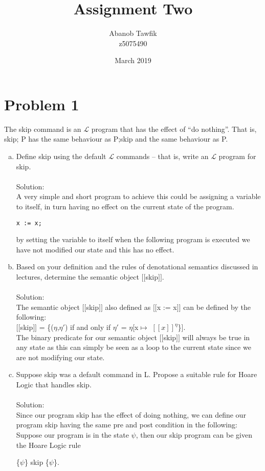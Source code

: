 \documentclass{article}
\title{Assignment Two}
\author{Abanob Tawfik\\z5075490}
\date{March 2019}
\newcommand*\moveToRight[1]{\hspace*{0em plus 1fill}\makebox{(#1)}}
\begin{document}
\maketitle
\section{Problem 1}
The skip command is an $\mathcal{L}$  program that has the effect of “do nothing”. That is, skip; P has the same behaviour as P;skip and the same behaviour as P.
\begin{enumerate}[(a)]
    \item Define skip using the default $\mathcal{L}$ commands – that is, write an $\mathcal{L}$ program for skip. \moveToRight{3 marks}\\\\
    Solution: \\
    A very simple and short program to achieve this could be assigning a variable to itself, in turn having no effect on the current state of the program.
    \begin{lstlisting}[language=Maple,mathescape=true]
x := x;
    \end{lstlisting}
    by setting the variable to itself when the following program is executed we have not modified our state and this has no effect. 
    
    \item Based on your definition and the rules of denotational semantics discussed in lectures, determine the semantic object $[\![$skip$]\!]$. \moveToRight{4 marks}\\\\
    Solution: \\
    The semantic object $[\![$skip$]\!]$ also defined as $[\![$x := x$]\!]$  can be defined by the following:\\
    $[\![$skip$]\!]$ = \{($\eta$,$\eta'$) if and only if $\eta'$ = $\eta$[x$\mapsto$ $[\![x]\!]^\eta$\}].\\
    The binary predicate for our semantic object $[\![$skip$]\!]$ will always be true in any state as this can simply be seen as a loop to the current state since we are not modifying our state.
    
    
    \item Suppose skip was a default command in L. Propose a suitable rule for Hoare Logic that handles skip. \moveToRight{3 marks}\\\\
    Solution: \\
    Since our program skip has the effect of doing nothing, we can define our program skip having the same pre and post condition in the following:\\
    Suppose our program is in the state $\psi$, then our skip program can be given the Hoare Logic rule
    \begin{center}
        \{$\psi$\} skip \{$\psi$\}.\\
    \end{center}
\end{enumerate}
\end{document}
